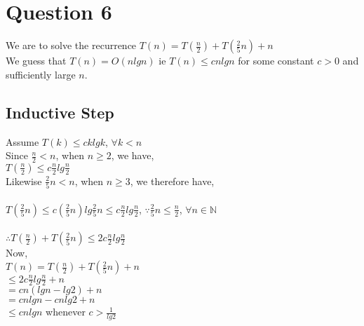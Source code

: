\documentclass{article}
\begin{document}
    \section{Question 6}
      We are to solve the recurrence $T(n) = T(\frac{n}{2}) + T(\frac{2}{5}n) + n$ \\
      We guess that $T(n) = O(n lg n)$ ie $T(n) \leq cnlgn$ for some constant $c > 0$ and sufficiently large $n$. \\
      \subsection{Inductive Step}
        Assume $T(k) \leq ck lg k$, $\forall k < n$ \\
        Since $\frac{n}{2} < n$, when $n \geq 2$, we have, \\
        $T(\frac{n}{2}) \leq c\frac{n}{2}lg \frac{n}{2}$ \\
        Likewise $\frac{2}{5}n < n$, when $n \geq 3$, we therefore have, \\
        \\
        $T(\frac{2}{5}n) \leq c(\frac{2}{5}n)lg\frac{2}{5}n \leq c\frac{n}{2}lg\frac{n}{2}$,  $\because \frac{2}{5}n \leq \frac{n}{2}$, $\forall n \in \mathbb{N}$ \\
        \\
        $\therefore T(\frac{n}{2}) + T(\frac{2}{5}n) \leq 2c\frac{n}{2}lg \frac{n}{2}$ \\
        Now, \\
        $T(n) = T(\frac{n}{2}) + T(\frac{2}{5}n) + n$ \\
        $\leq 2c\frac{n}{2}lg \frac{n}{2} + n$ \\
        $= cn(lg n - lg 2) + n$ \\
        $= cnlg n - cnlg2 + n$ \\
        $\leq cnlgn$   whenever $c > \frac{1}{lg2}$ \\
\end{document}
